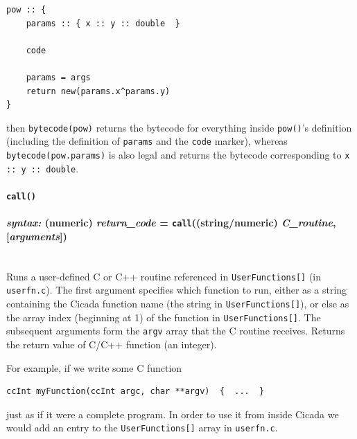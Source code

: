 \documentclass{article}
\newenvironment{code}{
       \begin{list}{}{
               \setlength{\leftmargin}{.4in}
               \setlength{\rightmargin}{0in}
               \setlength{\topsep}{.2in}
       }
       \small
       \item[] }
       { \end{list}   }
\begin{document}
\begin{code} \begin{verbatim}
pow :: {
    params :: { x :: y :: double  }
    
    code
    
    params = args
    return new(params.x^params.y)
}
\end{verbatim} \end{code}

\noindent then \verb#bytecode(pow)# returns the bytecode for everything inside \verb#pow()#'s definition (including the definition of \verb#params# and the \verb#code# marker), whereas \verb#bytecode(pow.params)# is also legal and returns the bytecode corresponding to \verb#x :: y :: double#.\\






\paragraph{\texttt{call()}\\\\
\normalfont \emph{syntax: } (numeric) \emph{return\_code} = \texttt{call}((string/numeric) \emph{C\_routine}, [\emph{arguments}])\\\\}

Runs a user-defined C or C++ routine referenced in \verb#UserFunctions[]# (in \verb#userfn.c#).  The first argument specifies which function to run, either as a string containing the Cicada function name (the string in \verb#UserFunctions[]#), or else as the array index (beginning at 1) of the function in \verb#UserFunctions[]#.  The subsequent arguments form the \texttt{argv} array that the C routine receives.  Returns the return value of C/C++ function (an integer).

For example, if we write some C function

\begin{code} \begin{verbatim}
ccInt myFunction(ccInt argc, char **argv)  {  ...  }
\end{verbatim} \end{code}

\noindent just as if it were a complete program.  In order to use it from inside Cicada we would add an entry to the \verb#UserFunctions[]# array in \verb#userfn.c#.
\end{document}
